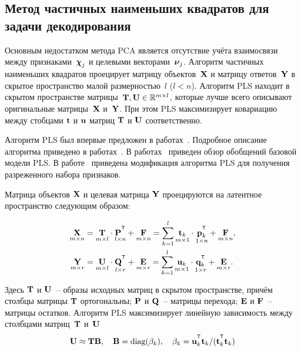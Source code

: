\subsection{Метод частичных наименьших квадратов для задачи декодирования}

Основным недостатком метода PCA является отсутствие учёта взаимосвязи между признаками~$\boldsymbol{\chi}_j$ и целевыми векторами~$\boldsymbol{\nu}_j$.
Алгоритм частичных наименьших квадратов проецирует матрицу объектов~$\mathbf{X}$ и матрицу ответов~$\mathbf{Y}$ в скрытое пространство малой размерностью~$l$ ($l < n$).
Алгоритм PLS находит в скрытом пространстве матрицы~$\mathbf{T}, \mathbf{U} \in \mathbb{R}^{m \times l}$, которые лучше всего описывают оригинальные матрицы~$\mathbf{X}$ и~$\mathbf{Y}$. 
При этом PLS максимизирует ковариацию между стобцами $\mathbf{t}$ и $\mathbf{u}$ матриц $\mathbf{T}$ и $\mathbf{U}$ соответственно.

Алгоритм PLS был впервые предложен в работах~\cite{wold1975path,wold1984collinearity,wold1982pls}. Подробное описание алгоритма приведено в работах~\cite{geladi1986partial,geladi1988notes,de1993simpls,vinzi2010handbook,brereton2014partial}.
В работах~\cite{rosipal2005overview,rosipal2011nonlinear} приведен обзор обобщений базовой модели PLS.
В работе~\cite{chun2010sparse} приведена модификация алгоритма PLS для получения разреженного набора признаков. 
 

Матрица объектов $\mathbf{X}$ и целевая матрица $\mathbf{Y}$ проецируются на латентное пространство следующим образом:

\begin{align}
	\label{ch1:eq:PLS_X}
	\underset{m \times n}{\bX} 
	&= \underset{m \times l}{\bT} \cdot \underset{l \times n}{\bP^{\T}} + \underset{m \times n}{\bF} 
	= \sum_{k=1}^l \underset{m \times 1}{\bt_k} \cdot \underset{1 \times n}{\bp_k^{\T}} + \underset{m \times n}{\bF},\\
	\label{ch1:eq:PLS_Y}
	\underset{m \times r}{\bY} 
	&= \underset{m \times l}{\bU} \cdot \underset{l \times r}{\bQ^{\T}} + \underset{m \times r}{\bE}
	=  \sum_{k=1}^l  \underset{m \times 1}{\bu_k} \cdot \underset{1 \times r}{\bq_k^{\T}} +  \underset{m \times r}{\bE}.
\end{align}

Здесь $\mathbf{T}$ и $\mathbf{U}$~-- образы исходных матриц в скрытом пространстве, причём столбцы матрицы $\mathbf{T}$ ортогональны; $\mathbf{P}$ и $\mathbf{Q}$~-- матрицы перехода; $\mathbf{E}$ и $\mathbf{F}$~-- матрицы остатков. 
Алгоритм PLS максимизирует линейную зависимость между столбцами матриц~$\mathbf{T}$ и~$\mathbf{U}$
\begin{equation*}
	\bU \approx \bT \bB, \quad \bB = \text{diag}(\beta_k), \quad \beta_k = \bu_k^{\T}\bt_k / (\bt_k^{\T}\bt_k)
\end{equation*}

